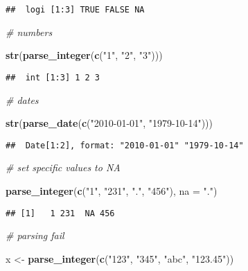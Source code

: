\documentclass[]{article}
\newenvironment{Shaded}{\begin{snugshade}}{\end{snugshade}}
\newcommand{\KeywordTok}[1]{\textcolor[rgb]{0.13,0.29,0.53}{\textbf{#1}}}
\newcommand{\DataTypeTok}[1]{\textcolor[rgb]{0.13,0.29,0.53}{#1}}
\newcommand{\StringTok}[1]{\textcolor[rgb]{0.31,0.60,0.02}{#1}}
\newcommand{\CommentTok}[1]{\textcolor[rgb]{0.56,0.35,0.01}{\textit{#1}}}
\newcommand{\NormalTok}[1]{#1}
\begin{document}
\begin{verbatim}
##  logi [1:3] TRUE FALSE NA
\end{verbatim}

\begin{Shaded}
\begin{Highlighting}[]
\CommentTok{# numbers}

\KeywordTok{str}\NormalTok{(}\KeywordTok{parse_integer}\NormalTok{(}\KeywordTok{c}\NormalTok{(}\StringTok{"1"}\NormalTok{, }\StringTok{"2"}\NormalTok{, }\StringTok{"3"}\NormalTok{)))}
\end{Highlighting}
\end{Shaded}

\begin{verbatim}
##  int [1:3] 1 2 3
\end{verbatim}

\begin{Shaded}
\begin{Highlighting}[]
\CommentTok{# dates}

\KeywordTok{str}\NormalTok{(}\KeywordTok{parse_date}\NormalTok{(}\KeywordTok{c}\NormalTok{(}\StringTok{"2010-01-01"}\NormalTok{, }\StringTok{"1979-10-14"}\NormalTok{)))}
\end{Highlighting}
\end{Shaded}

\begin{verbatim}
##  Date[1:2], format: "2010-01-01" "1979-10-14"
\end{verbatim}

\begin{Shaded}
\begin{Highlighting}[]
\CommentTok{# set specific values to NA}

\KeywordTok{parse_integer}\NormalTok{(}\KeywordTok{c}\NormalTok{(}\StringTok{"1"}\NormalTok{, }\StringTok{"231"}\NormalTok{, }\StringTok{"."}\NormalTok{, }\StringTok{"456"}\NormalTok{), }\DataTypeTok{na =} \StringTok{"."}\NormalTok{)}
\end{Highlighting}
\end{Shaded}

\begin{verbatim}
## [1]   1 231  NA 456
\end{verbatim}

\begin{Shaded}
\begin{Highlighting}[]
\CommentTok{# parsing fail}

\NormalTok{x <-}\StringTok{ }\KeywordTok{parse_integer}\NormalTok{(}\KeywordTok{c}\NormalTok{(}\StringTok{"123"}\NormalTok{, }\StringTok{"345"}\NormalTok{, }\StringTok{"abc"}\NormalTok{, }\StringTok{"123.45"}\NormalTok{))}
\end{Highlighting}
\end{Shaded}
\end{document}
